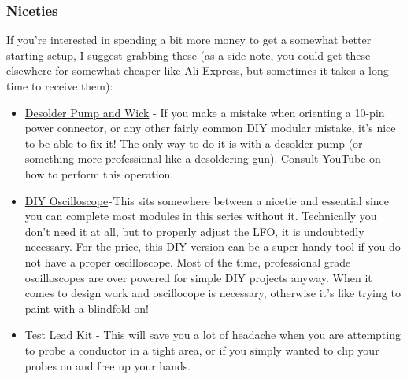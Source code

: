 \documentclass{article}
\begin{document}
\subsubsection{Niceties}
If you're interested in spending a bit more money to get a somewhat better starting setup, I suggest grabbing these (as a side note, you could get these elsewhere for somewhat cheaper like Ali Express, but sometimes it takes a long time to receive them):
\begin{itemize}
	\item
	\href{https://www.amazon.com/Desoldering-Solder-Sucker-Length-Remover/dp/B07BB8DGMP/ref=sr_1_2_sspa?dchild=1&keywords=solder+sucker&qid=1603054577&sr=8-2-spons&psc=1&spLa=ZW5jcnlwdGVkUXVhbGlmaWVyPUEzRUdUNzNHUFlSWkhZJmVuY3J5cHRlZElkPUEwMjc5MDIxMjdLQlVOM1ZUTVdYUSZlbmNyeXB0ZWRBZElkPUExMDI4NTYwMTk5QjQ3Mk1ENzVVNyZ3aWRnZXROYW1lPXNwX2F0ZiZhY3Rpb249Y2xpY2tSZWRpcmVjdCZkb05vdExvZ0NsaWNrPXRydWU=}{Desolder Pump and Wick} - If you make a mistake when orienting a 10-pin power connector, or any other fairly common DIY modular mistake, it's nice to be able to fix it! The only way to do it is with a desolder pump (or something more professional like a desoldering gun). Consult YouTube on how to perform this operation.
	\item 				\href{https://www.amazon.com/kuman-3O-IUX5-O0TZ-Digital-Oscilloscope-pre-soldered/dp/B0195ZIURK/ref=sr_1_3?crid=CO3U0HAF3DIW&dchild=1&keywords=diy+oscilloscope+kit&qid=1596929754&sprefix=DIY+Oscil%2Caps%2C137&sr=8-3}{DIY Oscilloscope} - This sits somewhere between a nicetie and essential since you can complete most modules in this series without it. Technically you don't need it at all, but to properly adjust the LFO, it is undoubtedly necessary. For the price, this DIY version can be a super handy tool if you do not have a proper oscilloscope. Most of the time, professional grade oscilloscopes are over powered for simple DIY projects anyway. When it comes to design work and oscillocope is necessary, otherwise it's like trying to paint with a blindfold on!
	\item
	\href{https://www.amazon.com/AstroAI-Multimeter-Electronic-Alligator-Upgraded/dp/B06XYNF47M/ref=pd_bxgy_img_3/138-6422028-7635844?_encoding=UTF8&pd_rd_i=B06XYNF47M&pd_rd_r=16cbb8cf-8d11-4f24-aba7-1675af99e358&pd_rd_w=ckNvu&pd_rd_wg=0pFeY&pf_rd_p=ce6c479b-ef53-49a6-845b-bbbf35c28dd3&pf_rd_r=D0T93BY49CFXVPVAFWQC&psc=1&refRID=D0T93BY49CFXVPVAFWQC}{Test Lead Kit} - This will save you a lot of headache when you are attempting to probe a conductor in a tight area, or if you simply wanted to clip your probes on and free up your hands.

\end{itemize}
\end{document}
